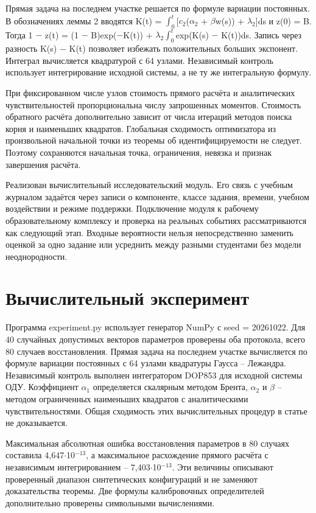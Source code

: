 \documentclass[blind]{psta}
\begin{document}
Прямая задача на последнем участке решается по формуле вариации постоянных. В обозначениях леммы 2 вводятся K(t) = $\int_0^t$[$c_{2}$($\alpha_{2}$ + $\beta$w(s)) + $\lambda_{2}$]ds и z(0) = B. Тогда 1 $-$ z(t) = (1 $-$ B)exp($-$K(t)) + $\lambda_{2}$$\int_0^t$exp(K(s) $-$ K(t))ds. Запись через разность K(s) $-$ K(t) позволяет избежать положительных больших экспонент. Интеграл вычисляется квадратурой с 64 узлами. Независимый контроль использует интегрирование исходной системы, а не ту же интегральную формулу.

При фиксированном числе узлов стоимость прямого расчёта и аналитических чувствительностей пропорциональна числу запрошенных моментов. Стоимость обратного расчёта дополнительно зависит от числа итераций методов поиска корня и наименьших квадратов. Глобальная сходимость оптимизатора из произвольной начальной точки из теоремы об идентифицируемости не следует. Поэтому сохраняются начальная точка, ограничения, невязка и признак завершения расчёта.

Реализован вычислительный исследовательский модуль. Его связь с учебным журналом задаётся через записи о компоненте, классе задания, времени, учебном воздействии и режиме поддержки. Подключение модуля к рабочему образовательному комплексу и проверка на реальных событиях рассматриваются как следующий этап. Входные вероятности нельзя непосредственно заменить оценкой за одно задание или усреднить между разными студентами без модели неоднородности.

\FloatBarrier
\section{Вычислительный эксперимент}
Программа experiment.py использует генератор NumPy с seed = 20261022. Для 40 случайных допустимых векторов параметров проверены оба протокола, всего 80 случаев восстановления. Прямая задача на последнем участке вычисляется по формуле вариации постоянных с 64 узлами квадратуры Гаусса – Лежандра. Независимый контроль выполнен интегратором DOP853 для исходной системы ОДУ. Коэффициент $\alpha_{1}$ определяется скалярным методом Брента, $\alpha_{2}$ и $\beta$ – методом ограниченных наименьших квадратов с аналитическими чувствительностями. Общая сходимость этих вычислительных процедур в статье не доказывается.

Максимальная абсолютная ошибка восстановления параметров в 80 случаях составила 4,647$\cdot$10$^{-13}$, а максимальное расхождение прямого расчёта с независимым интегрированием – 7,403$\cdot$10$^{-13}$. Эти величины описывают проверенный диапазон синтетических конфигураций и не заменяют доказательства теоремы. Две формулы калибровочных определителей дополнительно проверены символьными вычислениями.
\end{document}
